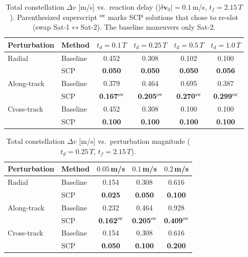 \documentclass[10pt,twocolumn,letterpaper]{article}
\begin{document}
\begin{table}[t]
\centering
\caption{Total constellation $\Delta v$ [m/s] vs.\ reaction delay
($|\delta\mathbf{v}_0| = 0.1$\,m/s, $t_f = 2.15\,T$). Parenthesized
superscript $^{\mathrm{sw}}$ marks SCP solutions that chose to re-slot
(swap Sat-1$\leftrightarrow$Sat-2). The baseline maneuvers only Sat-2.}
\label{tab:delay}
\small
\setlength{\tabcolsep}{6pt}
\begin{tabular}{@{}llcccc@{}}
\toprule
\textbf{Perturbation} & \textbf{Method} & $t_d = 0.1\,T$ & $t_d = 0.25\,T$ & $t_d = 0.5\,T$ & $t_d = 1.0\,T$ \\
\midrule
Radial      & Baseline & 0.452 & 0.308 & 0.102 & 0.100 \\
            & SCP      & \textbf{0.050} & \textbf{0.050} & \textbf{0.050} & \textbf{0.056} \\
\midrule
Along-track & Baseline & 0.379 & 0.464 & 0.695 & 0.387 \\
            & SCP      & \textbf{0.167}$^{\mathrm{sw}}$ & \textbf{0.205}$^{\mathrm{sw}}$ & \textbf{0.270}$^{\mathrm{sw}}$ & \textbf{0.299}$^{\mathrm{sw}}$ \\
\midrule
Cross-track & Baseline & 0.452 & 0.308 & 0.100 & 0.100 \\
            & SCP      & \textbf{0.100} & \textbf{0.100} & \textbf{0.100} & \textbf{0.100} \\
\bottomrule
\end{tabular}
\end{table}

\begin{table}[t]
\centering
\caption{Total constellation $\Delta v$ [m/s] vs.\ perturbation magnitude
($t_d = 0.25\,T$, $t_f = 2.15\,T$).}
\label{tab:magnitude}
\small
\setlength{\tabcolsep}{4.5pt}
\begin{tabular}{@{}llccc@{}}
\toprule
\textbf{Perturbation} & \textbf{Method} & $0.05$\,m/s & $0.1$\,m/s & $0.2$\,m/s \\
\midrule
Radial      & Baseline & 0.154 & 0.308 & 0.616 \\
            & SCP      & \textbf{0.025} & \textbf{0.050} & \textbf{0.100} \\
\midrule
Along-track & Baseline & 0.232 & 0.464 & 0.928 \\
            & SCP      & \textbf{0.162}$^{\mathrm{sw}}$ & \textbf{0.205}$^{\mathrm{sw}}$ & \textbf{0.409}$^{\mathrm{sw}}$ \\
\midrule
Cross-track & Baseline & 0.154 & 0.308 & 0.616 \\
            & SCP      & \textbf{0.050} & \textbf{0.100} & \textbf{0.200} \\
\bottomrule
\end{tabular}
\end{table}
\end{document}
